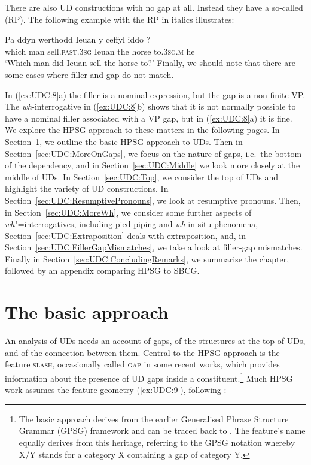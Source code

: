 \documentclass[output=paper
,notxmath 
 	        ,biblatex
                ,babelshorthands
                ,newtxmath
                ,draftmode
                ,colorlinks, citecolor=brown
]{langscibook}
\begin{document}
\noindent 
There are also UD constructions with no gap at all. Instead they
have a so-called  (RP). The following 
example with the RP in italics illustrates:

\ea
\label{ex:UDC:7}
\gll Pa    ddyn werthodd               Ieuan y   ceffyl iddo             ?\\
     which man  sell.\textsc{past.3sg} Ieuan the horse  to\textsc{.3sg.m} he\\
\glt `Which man did Ieuan sell the horse to?'
\z
\noindent
Finally, we should note that there are some cases where filler and gap
do not match.

\eal
\label{ex:UDC:8} 
\zl

\noindent 
In (\ref{ex:UDC:8}a) the filler is a nominal expression, but the
gap is a non-finite VP. The \emph{wh}-interrogative in
(\ref{ex:UDC:8}b) shows that it is not normally possible to have a
nominal filler associated with a VP gap, but in (\ref{ex:UDC:8}a) it
is fine.  We explore the HPSG approach to these matters in the
following pages. In Section~\ref{sec:UDC:BasicApproach}, we outline
the basic HPSG approach to UDs. Then in
Section~\ref{sec:UDC:MoreOnGaps}, we focus on the nature of gaps,
i.e.\ the bottom of the dependency, and in Section~\ref{sec:UDC:Middle}
we look more closely at the middle of UDs. In
Section~\ref{sec:UDC:Top}, we consider the top of UDs and highlight
the variety of UD constructions. In
Section~\ref{sec:UDC:ResumptivePronouns}, we look at resumptive
pronouns. Then, in Section~\ref{sec:UDC:MoreWh}, we consider some
further aspects of \emph{wh}"=interrogatives, including pied-piping
and \emph{wh}-in-situ phenomena, Section~\ref{sec:UDC:Extraposition} deals with extraposition, and, in
Section~\ref{sec:UDC:FillerGapMismatches}, we take a look at
filler-gap mismatches.  Finally in
Section~\ref{sec:UDC:ConcludingRemarks}, we summarise the chapter,
followed by an appendix comparing HPSG to SBCG.  

\section{The basic approach}
\label{sec:UDC:BasicApproach} 

An analysis of UDs needs an
account of gaps, of the structures at the top of UDs, and of the
connection between them. Central to the HPSG approach is the feature
\textsc{slash}, occasionally called \textsc{gap} in some recent works,
which provides information about the presence of UD gaps inside a
constituent.\footnote{The basic approach derives from the earlier
  Generalised Phrase Structure Grammar (GPSG) framework
  \citep*{Gazdar85} and can be traced back to \citet{gazdar_g81}. The
  feature's name equally derives from this heritage, referring to the
  GPSG notation whereby X/Y stands for a category X containing a gap of
  category Y.} 
Much HPSG work assumes the feature geometry (\ref{ex:UDC:9}), following \citet[Chapter~4]{Pollard:Sag:94}:
\end{document}
